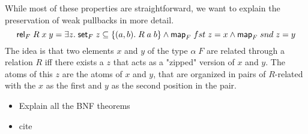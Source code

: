   While most of these properties are straightforward, we want to explain the preservation of weak pullbacks in more detail.
  \begin{equation}
    \text{\textsf{rel}}_F\; R\; x\; y = \exists z.\; \text{\textsf{set}}_F\; z \subseteq \{(a, b).\; R\; a\; b \} \land 
      \text{\textsf{map}}_F\; fst\; z = x \land \text{\textsf{map}}_F\; snd\; z = y \label{eq:WP}
  \end{equation}
  The idea is that two elements $x$ and $y$ of the type $\alpha\; F$ are related through a relation $R$ iff there exists a $z$ that acts as a "zipped" version of $x$ and $y$. The atoms of this $z$ are the atoms of $x$ and $y$, that are organized in pairs of $R$-related with the $x$ as the first and $y$ as the second position in the pair.
  \begin{itemize}
    \item Explain all the BNF theorems
    \item cite \cite{blanchette2019bindings}
  \end{itemize}

